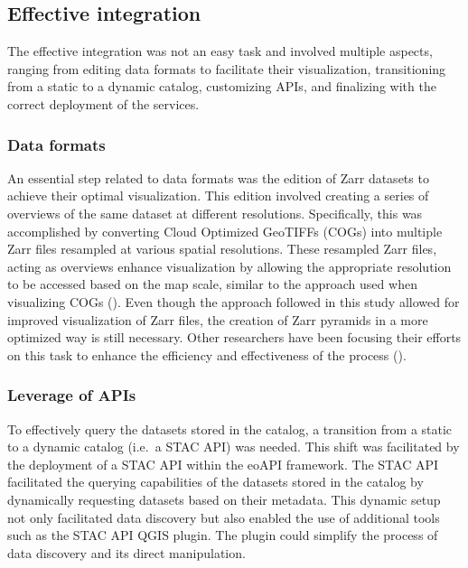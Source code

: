 \documentclass[
  oneside,
  open=any]{scrbook}
\begin{document}
\subsection{Effective integration}\label{effective-integration}

The effective integration was not an easy task and involved multiple
aspects, ranging from editing data formats to facilitate their
visualization, transitioning from a static to a dynamic catalog,
customizing APIs, and finalizing with the correct deployment of the
services.

\subsubsection*{Data formats}\label{data-formats}

An essential step related to data formats was the edition of Zarr
datasets to achieve their optimal visualization. This edition involved
creating a series of overviews of the same dataset at different
resolutions. Specifically, this was accomplished by converting Cloud
Optimized GeoTIFFs (COGs) into multiple Zarr files resampled at various
spatial resolutions. These resampled Zarr files, acting as overviews
enhance visualization by allowing the appropriate resolution to be
accessed based on the map scale, similar to the approach used when
visualizing COGs (). Even though the approach followed in this study allowed for
improved visualization of Zarr files, the creation of Zarr pyramids in a
more optimized way is still necessary. Other researchers have been
focusing their efforts on this task to enhance the efficiency and
effectiveness of the process
().

\subsubsection*{Leverage of APIs}\label{leverage-of-apis}

To effectively query the datasets stored in the catalog, a transition
from a static to a dynamic catalog (i.e.~a STAC API) was needed. This
shift was facilitated by the deployment of a STAC API within the eoAPI
framework. The STAC API facilitated the querying capabilities of the
datasets stored in the catalog by dynamically requesting datasets based
on their metadata. This dynamic setup not only facilitated data
discovery but also enabled the use of additional tools such as the STAC
API QGIS plugin. The plugin could simplify the process of data discovery
and its direct manipulation.
\end{document}
